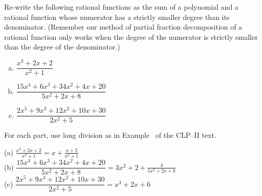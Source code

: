 
\begin{Mquestion}
Re-write the following rational functions as the sum of a polynomial and a rational function whose numerator has a strictly smaller degree than its denominator. (Remember our method of partial fraction decomposition of a rational function only works when the degree of the numerator is strictly smaller than the degree of the denominator.)
\begin{enumerate}[(a)]
\item $\dfrac{x^3+2x+2}{x^2+1}$
\item $\dfrac{15x^4+6x^3+34x^2+4x+20}{5x^2+2x+8}$
\item $\dfrac{2x^5+9x^3+12x^2+10x+30}{2x^2+5}$
\end{enumerate}

\end{Mquestion}
\begin{hint}
For each part,  use long division as in Example~ of the CLP--II text.
\end{hint}
\begin{answer}
(a) $\displaystyle\frac{x^3+2x+2}{x^2+1} = x+\frac{x+2}{x^2+1}$\\[10pt]
(b) $\displaystyle\dfrac{15x^4+6x^3+34x^2+4x+20}{5x^2+2x+8} = 3x^2+2+\frac{4}{5x^2+2x+8}$\\[10pt]
(c) $\displaystyle\dfrac{2x^5+9x^3+12x^2+10x+30}{2x^2+5}=x^3+2x+6$
\end{answer}

